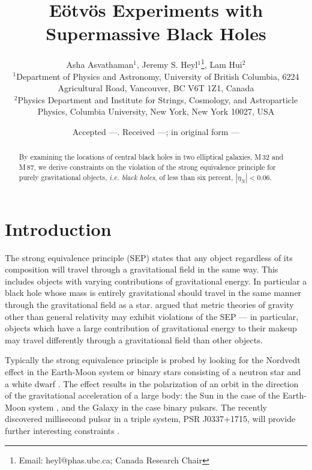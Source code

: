 \documentclass[useAMS,usenatbib]{mn2e}
\title[E\"otv\"os Experiments]{E\"otv\"os Experiments with 
  Supermassive Black Holes  }
\author[Asvathaman, Heyl \& Hui]{Asha Asvathaman$^{1}$, Jeremy S. Heyl$^{1}$\thanks{Email:
    heyl@phas.ubc.ca; Canada Research Chair}, Lam Hui$^{2}$ \\
$^{1}$Department of Physics and Astronomy, University of British
  Columbia, 6224 Agricultural Road, Vancouver, BC V6T 1Z1, Canada\\
  $^{2}$Physics Department and Institute for Strings, Cosmology, and Astroparticle Physics, Columbia University, New York, New York 10027, USA}
\begin{document}
\date{Accepted ---. Received ---; in original form ---}

\pagerange{\pageref{firstpage}--\pageref{lastpage}} 

\maketitle

\label{firstpage}

\begin{abstract}
  By examining the locations of central black holes in two elliptical
  galaxies, M\,32 and M\,87, we derive constraints on the violation of
  the strong equivalence principle for purely gravitational objects,
  {\em i.e. black holes}, of less than six percent, $|\eta_N|<0.06$.
\end{abstract}

\section{Introduction}

The strong equivalence principle (SEP) states that any object
regardless of its composition will travel through a gravitational
field in the same way.  This includes objects with varying
contributions of gravitational energy.  In particular a black hole
whose mass is entirely gravitational should travel in the same manner
through the gravitational field as a
star. \citet{1968PhRv..169.1014N,1968PhRv..169.1017N} argued that
metric theories of gravity other than general relativity may exhibit
violations of the SEP --- in particular,
objects 
which
have a large contribution of gravitational energy to
their makeup may travel differently through a gravitational field than
other objects.

Typically the strong equivalence principle is probed by looking for
the Nordvedt effect in the Earth-Moon system or binary stars
consisting of a neutron star and a white dwarf \citep{Stairs:2005}.
The \citet{1968PhRv..170.1186N} effect results in the polarization of
an orbit in the direction of the gravitational acceleration of a large
body: the Sun in the case of the Earth-Moon system
\citep{1976PhRvL..36..551W,1976PhRvL..36..555S}, and the Galaxy in the
case binary pulsars.  The recently discovered millisecond pulsar in a
triple system, PSR J0337+1715, will provide further interesting
constraints \citep{Ransom:2014aa}.
\end{document}
